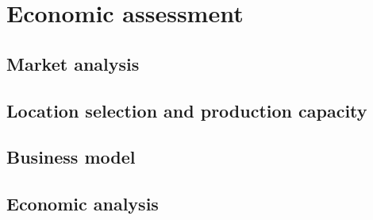 \section{Economic assessment}
\label{sec:economics}
\subsection{Market analysis}



\subsection{Location selection and production capacity}

\subsection{Business model}

\subsection{Economic analysis}